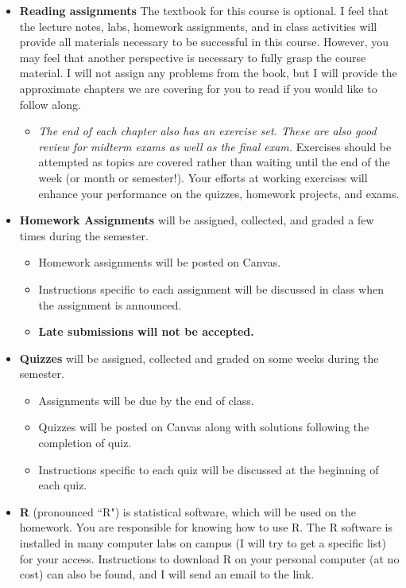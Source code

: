 \documentclass[11pt]{article}
\begin{document}
\begin{itemize} \itemsep 0.1in
\item[]  \textbf{Reading assignments} The textbook for this course is optional.  I feel that the lecture notes, labs, homework assignments, and in class activities will provide all materials necessary to be successful in this course.  However, you may feel that another perspective is necessary to fully grasp the course material. I will not assign any problems from the book, but I will provide the approximate chapters we are covering for you to read if you would like to follow along.  
\begin{itemize} \itemsep 0.2cm
\item \emph{The end of each chapter also has an exercise
set. These are also good review for midterm exams as well as the
final exam.} Exercises should be attempted as topics are covered
rather than waiting until the end of the week (or month or
semester!). Your efforts at working exercises will enhance
your performance on the quizzes, homework projects, and exams.\\
\end{itemize}

\item[] \textbf{Homework Assignments} will be assigned,
collected, and graded a few times during the semester.
\begin{itemize} \itemsep 0.2cm
\item Homework assignments will be posted on Canvas.
\item Instructions specific to each assignment will be discussed in class when the assignment is announced.
\item \textbf{Late submissions will not be accepted.}
\end{itemize}

\item[] \textbf{Quizzes} will be assigned,
collected and graded on some weeks during the semester.
\begin{itemize} \itemsep 0.2cm
\item Assignments will be due by the end of class.
\item Quizzes will be posted on Canvas along with solutions following the completion of quiz.
\item Instructions specific to each quiz will be discussed at the beginning of each quiz.
\end{itemize}

\item[] \textbf{R} (pronounced ``R") is statistical software, which will be used on the homework.  You are responsible for knowing how to use R.  The R software is installed in many computer labs on campus (I will try to get a specific list) for your access. Instructions to download R on your personal computer (at no cost) can also be found, and I will send an email to the link.\\



\end{itemize}
\end{document}
